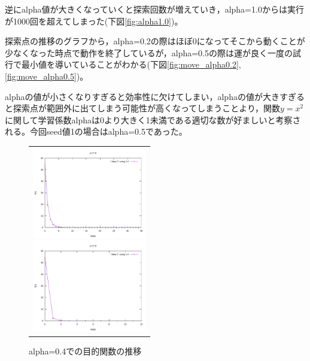 逆にalpha値が大きくなっていくと探索回数が増えていき，alpha=1.0からは実行が1000回を超えてしまった(下図\ref{fig:alpha1.0})。

探索点の推移のグラフから，alpha=0.2の際はほぼ0になってそこから動くことが少なくなった時点で動作を終了しているが，alpha=0.5の際は運が良く一度の試行で最小値を導いていることがわかる(下図\ref{fig:move_alpha0.2},\ref{fig:move_alpha0.5})。

alphaの値が小さくなりすぎると効率性に欠けてしまい，alphaの値が大きすぎると探索点が範囲外に出てしまう可能性が高くなってしまうことより，関数$y=x^2$に関して学習係数alphaは0より大きく1未満である適切な数が好ましいと考察される。今回seed値1の場合はalpha=0.5であった。

\begin{figure}[h]
 \begin{center}
  \begin{tabular}{c}
    \begin{minipage}{0.33\hsize}
    \begin{center}
    \includegraphics[width=5.0cm]{figs/level2.1/alpha02.pdf}
    \caption{alpha=0.2での目的関数の推移}
    \label{fig:alpha0.2}
    \end{center}
    \end{minipage}
    
    \begin{minipage}{0.33\hsize}
    \begin{center}
    \includegraphics[width=5.0cm]{figs/level2.1/alpha04.pdf}
    \caption{alpha=0.4での目的関数の推移}
    \label{fig:alpha0.4}
    \end{center}
    \end{minipage}
    

\end{tabular}
\end{center}
\end{figure}

